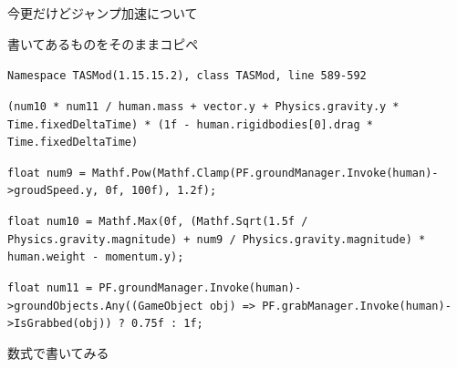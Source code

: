 \documentclass[fleqn]{jlreq}
\begin{document}
今更だけどジャンプ加速について\par
書いてあるものをそのままコピペ\par
\texttt{Namespace TASMod(1.15.15.2), class TASMod, line 589-592}\par
\texttt{(num10 * num11 / human.mass + vector.y + Physics.gravity.y * Time.fixedDeltaTime) * (1f - human.rigidbodies[0].drag * Time.fixedDeltaTime)}\par
\texttt{float num9 = Mathf.Pow(Mathf.Clamp(PF.groundManager.Invoke(human)->groudSpeed.y, 0f, 100f), 1.2f);}\par
\texttt{float num10 = Mathf.Max(0f, (Mathf.Sqrt(1.5f / Physics.gravity.magnitude) + num9 / Physics.gravity.magnitude) * human.weight - momentum.y);}\par
\texttt{float num11 = PF.groundManager.Invoke(human)->groundObjects.Any((GameObject obj) => PF.grabManager.Invoke(human)->IsGrabbed(obj)) ? 0.75f : 1f;}\par
数式で書いてみる\par
\end{document}
